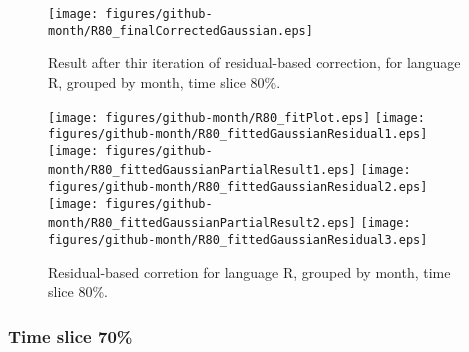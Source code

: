 \begin{figure}[]
\centering
{\texttt{[image: figures/github-month/R80\_finalCorrectedGaussian.eps]}}
\caption{Result after thir iteration of residual-based correction, for language R, grouped by month, time slice 80\%.}
\end{figure}


\begin{figure}[hb]
\centering
{}
{\texttt{[image: figures/github-month/R80\_fitPlot.eps]}}
{\texttt{[image: figures/github-month/R80\_fittedGaussianResidual1.eps]}}
{\texttt{[image: figures/github-month/R80\_fittedGaussianPartialResult1.eps]}}
{\texttt{[image: figures/github-month/R80\_fittedGaussianResidual2.eps]}}
{\texttt{[image: figures/github-month/R80\_fittedGaussianPartialResult2.eps]}}
{\texttt{[image: figures/github-month/R80\_fittedGaussianResidual3.eps]}}
\caption{Residual-based corretion for language R, grouped by month, time slice 80\%.}
\end{figure}


\clearpage 
\newpage 


\FloatBarrier

\subsubsection{Time slice 70\%}


